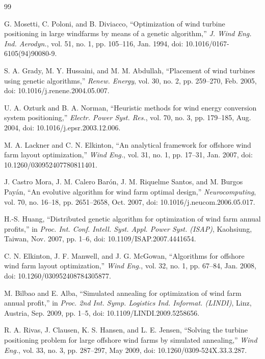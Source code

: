 \documentclass[journal,twoside]{IEEEtran}
\begin{document}
\begin{thebibliography}{99}

G. Mosetti, C. Poloni, and B. Diviacco, ``Optimization of wind turbine positioning in large windfarms by means of a genetic algorithm,'' \textit{J. Wind Eng. Ind. Aerodyn.}, vol. 51, no. 1, pp. 105--116, Jan. 1994, doi: 10.1016/0167-6105(94)90080-9.

S. A. Grady, M. Y. Hussaini, and M. M. Abdullah, ``Placement of wind turbines using genetic algorithms,'' \textit{Renew. Energy}, vol. 30, no. 2, pp. 259--270, Feb. 2005, doi: 10.1016/j.renene.2004.05.007.

U. A. Ozturk and B. A. Norman, ``Heuristic methods for wind energy conversion system positioning,'' \textit{Electr. Power Syst. Res.}, vol. 70, no. 3, pp. 179--185, Aug. 2004, doi: 10.1016/j.epsr.2003.12.006.

M. A. Lackner and C. N. Elkinton, ``An analytical framework for offshore wind farm layout optimization,'' \textit{Wind Eng.}, vol. 31, no. 1, pp. 17--31, Jan. 2007, doi: 10.1260/030952407780811401.

J. Castro Mora, J. M. Calero Bar\'on, J. M. Riquelme Santos, and M. Burgos Pay\'an, ``An evolutive algorithm for wind farm optimal design,'' \textit{Neurocomputing}, vol. 70, no. 16--18, pp. 2651--2658, Oct. 2007, doi: 10.1016/j.neucom.2006.05.017.

H.-S. Huang, ``Distributed genetic algorithm for optimization of wind farm annual profits,'' in \textit{Proc. Int. Conf. Intell. Syst. Appl. Power Syst. (ISAP)}, Kaohsiung, Taiwan, Nov. 2007, pp. 1--6, doi: 10.1109/ISAP.2007.4441654.

C. N. Elkinton, J. F. Manwell, and J. G. McGowan, ``Algorithms for offshore wind farm layout optimization,'' \textit{Wind Eng.}, vol. 32, no. 1, pp. 67--84, Jan. 2008, doi: 10.1260/030952408784305877.

M. Bilbao and E. Alba, ``Simulated annealing for optimization of wind farm annual profit,'' in \textit{Proc. 2nd Int. Symp. Logistics Ind. Informat. (LINDI)}, Linz, Austria, Sep. 2009, pp. 1--5, doi: 10.1109/LINDI.2009.5258656.

R. A. Rivas, J. Clausen, K. S. Hansen, and L. E. Jensen, ``Solving the turbine positioning problem for large offshore wind farms by simulated annealing,'' \textit{Wind Eng.}, vol. 33, no. 3, pp. 287--297, May 2009, doi: 10.1260/0309-524X.33.3.287.


\end{thebibliography}
\end{document}

